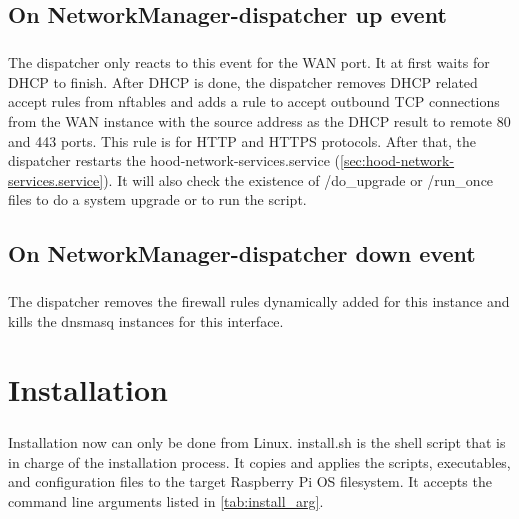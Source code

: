 \documentclass[mscthesis]{usiinfthesis}
\begin{document}
\section{On NetworkManager-dispatcher up event}
\paragraph{}
The dispatcher only reacts to this event for the WAN port. It at first waits for DHCP to finish. After DHCP is done, the dispatcher removes DHCP related accept rules from nftables and adds a rule to accept outbound TCP connections from the WAN instance with the source address as the DHCP result to remote 80 and 443 ports. This rule is for HTTP and HTTPS protocols. After that, the dispatcher restarts the hood-network-services.service (\cref{sec:hood-network-services.service}). It will also check the existence of /do\_upgrade or /run\_once files to do a system upgrade or to run the script.

\section{On NetworkManager-dispatcher down event}
\paragraph{}
The dispatcher removes the firewall rules dynamically added for this instance and kills the dnsmasq instances for this interface.

\chapter{Installation}\label{cha:install}
\paragraph{}
Installation now can only be done from Linux. install.sh is the shell script that is in charge of the installation process. It copies and applies the scripts, executables, and configuration files to the target Raspberry Pi OS filesystem. It accepts the command line arguments listed in \cref{tab:install_arg}.
\end{document}
